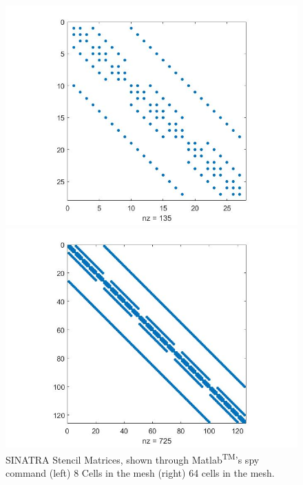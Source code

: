 \begin{figure}
    \centering
  \begin{minipage}[b]{0.49\textwidth}
    \includegraphics[width=\textwidth]{figures/sparse_8.jpg}
  \end{minipage} %
  \begin{minipage}[b]{0.49\textwidth}
    \includegraphics[width=\textwidth]{figures/sparse_64.jpg}

  \end{minipage}
  \caption[Sparse Stencil Matrix]{SINATRA Stencil Matrices, shown through Matlab\textsuperscript{TM}'s spy command (left) 8 Cells in the mesh (right) 64 cells in the mesh.}
  \label{fig:sparse}
\end{figure}


